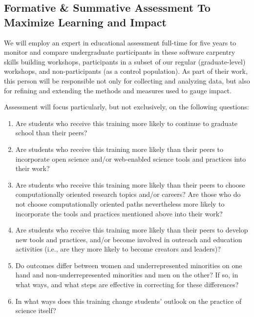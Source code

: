 \documentclass{proposalnsf}
\begin{document}
\subsection{Formative & Summative Assessment To Maximize Learning and Impact}

We will employ an expert in educational assessment full-time for five
years to monitor and compare undergraduate participants in these software carpentry skills building
workshops, participants in a subset of our regular (graduate-level)
workshops, and non-participants (as a control population).  As part of
their work, this person will be responsible not only for collecting
and analyzing data, but also for refining and extending the methods
and measures used to gauge impact.

Assessment will focus particularly, but not exclusively, on the
following questions:

\begin{enumerate}

\item
  Are students who receive this training more likely to continue to
  graduate school than their peers?

\item
  Are students who receive this training more likely than their peers
  to incorporate open science and/or web-enabled science tools and
  practices into their work?

\item
  Are students who receive this training more likely than their peers
  to choose computationally oriented research topics and/or careers?
  Are those who do not choose computationally oriented paths
  nevertheless more likely to incorporate the tools and practices
  mentioned above into their work?

\item
  Are students who receive this training more likely than their peers
  to develop new tools and practices, and/or become involved in
  outreach and education activities (i.e., are they more likely to
  become creators and leaders)?

\item
  Do outcomes differ between women and underrepresented minorities on
  one hand and non-underrepresented minorities and men on the other?
  If so, in what ways, and what steps are effective in correcting for
  these differences?

\item
  In what ways does this training change students' outlook on the
  practice of science itself?

\end{enumerate}
\end{document}
